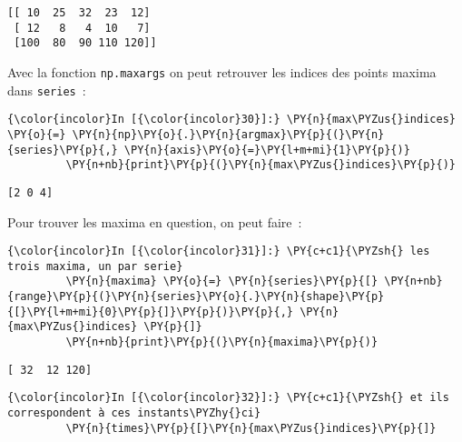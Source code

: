     \begin{Verbatim}[commandchars=\\\{\},frame=single,framerule=0.3mm,rulecolor=\color{cellframecolor}]
[[ 10  25  32  23  12]
 [ 12   8   4  10   7]
 [100  80  90 110 120]]
\end{Verbatim}

    Avec la fonction \texttt{np.maxargs} on peut retrouver les indices des
points maxima dans \texttt{series}~:

    \begin{Verbatim}[commandchars=\\\{\},frame=single,framerule=0.3mm,rulecolor=\color{cellframecolor}]
{\color{incolor}In [{\color{incolor}30}]:} \PY{n}{max\PYZus{}indices} \PY{o}{=} \PY{n}{np}\PY{o}{.}\PY{n}{argmax}\PY{p}{(}\PY{n}{series}\PY{p}{,} \PY{n}{axis}\PY{o}{=}\PY{l+m+mi}{1}\PY{p}{)}
         \PY{n+nb}{print}\PY{p}{(}\PY{n}{max\PYZus{}indices}\PY{p}{)}
\end{Verbatim}


    \begin{Verbatim}[commandchars=\\\{\},frame=single,framerule=0.3mm,rulecolor=\color{cellframecolor}]
[2 0 4]
\end{Verbatim}

    Pour trouver les maxima en question, on peut faire~:

    \begin{Verbatim}[commandchars=\\\{\},frame=single,framerule=0.3mm,rulecolor=\color{cellframecolor}]
{\color{incolor}In [{\color{incolor}31}]:} \PY{c+c1}{\PYZsh{} les trois maxima, un par serie}
         \PY{n}{maxima} \PY{o}{=} \PY{n}{series}\PY{p}{[} \PY{n+nb}{range}\PY{p}{(}\PY{n}{series}\PY{o}{.}\PY{n}{shape}\PY{p}{[}\PY{l+m+mi}{0}\PY{p}{]}\PY{p}{)}\PY{p}{,} \PY{n}{max\PYZus{}indices} \PY{p}{]}
         \PY{n+nb}{print}\PY{p}{(}\PY{n}{maxima}\PY{p}{)}
\end{Verbatim}


    \begin{Verbatim}[commandchars=\\\{\},frame=single,framerule=0.3mm,rulecolor=\color{cellframecolor}]
[ 32  12 120]
\end{Verbatim}

    \begin{Verbatim}[commandchars=\\\{\},frame=single,framerule=0.3mm,rulecolor=\color{cellframecolor}]
{\color{incolor}In [{\color{incolor}32}]:} \PY{c+c1}{\PYZsh{} et ils correspondent à ces instants\PYZhy{}ci}
         \PY{n}{times}\PY{p}{[}\PY{n}{max\PYZus{}indices}\PY{p}{]}
\end{Verbatim}


